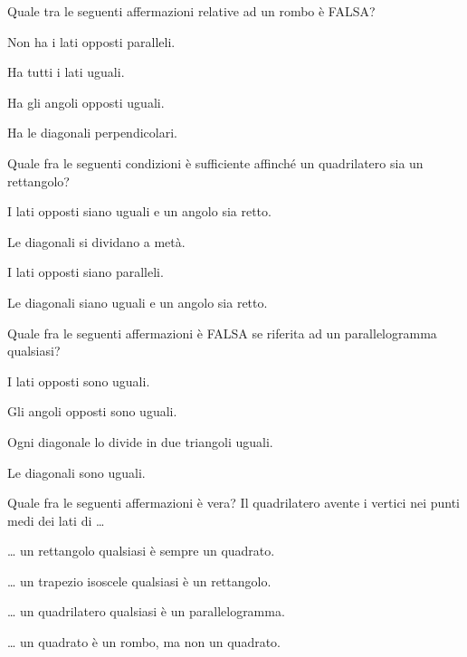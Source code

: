 \begin{esercizio}
\label{ese:4.63}
Quale tra le seguenti affermazioni relative ad un rombo è FALSA?
\begin{multicols}{2}
\begin{enumeratea}
\item Non ha i lati opposti paralleli.
\item Ha tutti i lati uguali.
\item Ha gli angoli opposti uguali.
\item Ha le diagonali perpendicolari.
\end{enumeratea}
\end{multicols}
\end{esercizio}

\begin{esercizio}
\label{ese:4.64}
Quale fra le seguenti condizioni è sufficiente affinché un quadrilatero sia un rettangolo?
\begin{enumeratea}
\item I lati opposti siano uguali e un angolo sia retto.
\item Le diagonali si dividano a metà.
\item I lati opposti siano paralleli.
\item Le diagonali siano uguali e un angolo sia retto.
\end{enumeratea}
\end{esercizio}

\begin{esercizio}
\label{ese:4.65}
Quale fra le seguenti affermazioni è FALSA se riferita ad un parallelogramma qualsiasi?
\begin{enumeratea}
\item I lati opposti sono uguali.
\item Gli angoli opposti sono uguali.
\item Ogni diagonale lo divide in due triangoli uguali.
\item Le diagonali sono uguali.
\end{enumeratea}
\end{esercizio}

\begin{esercizio}
\label{ese:4.66}
Quale fra le seguenti affermazioni è vera?
Il quadrilatero avente i vertici nei punti medi dei lati di \ldots{}
\begin{enumeratea}
\item \ldots{} un rettangolo qualsiasi è sempre un quadrato.
\item \ldots{} un trapezio isoscele qualsiasi è un rettangolo.
\item \ldots{} un quadrilatero qualsiasi è un parallelogramma.
\item \ldots{} un quadrato è un rombo, ma non un quadrato.
\end{enumeratea}
\end{esercizio}

